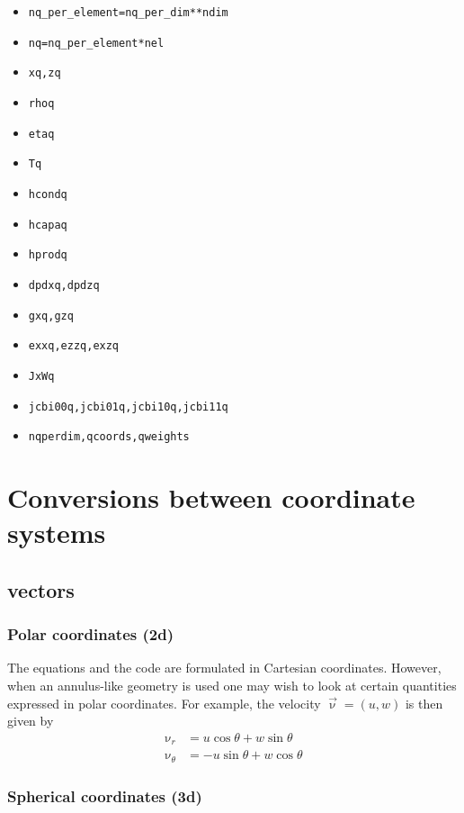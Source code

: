 \documentclass[a4paper,12pt]{article}
\begin{document}
\begin{itemize}
\item \lstinline{nq_per_element=nq_per_dim**ndim}
\item \lstinline{nq=nq_per_element*nel}
\item \lstinline{xq,zq}
\item \lstinline{rhoq}
\item \lstinline{etaq}
\item \lstinline{Tq}
\item \lstinline{hcondq}
\item \lstinline{hcapaq}
\item \lstinline{hprodq}
\item \lstinline{dpdxq,dpdzq}
\item \lstinline{gxq,gzq}
\item \lstinline{exxq,ezzq,exzq}
\item \lstinline{JxWq}
\item \lstinline{jcbi00q,jcbi01q,jcbi10q,jcbi11q}
\item \lstinline{nqperdim,qcoords,qweights}
\end{itemize}


\newpage
\section{Conversions between coordinate systems}

\subsection{vectors}

\subsubsection{Polar coordinates (2d)}

The equations and the code are formulated in Cartesian coordinates. 
However, when an annulus-like geometry is used one may wish to look at 
certain quantities expressed in polar coordinates.
For example, the velocity $\vec\upnu=(u,w)$ is then given by
\begin{align}
\upnu_r &=  u \cos\theta + w \sin\theta \\
\upnu_\theta &= -u \sin\theta + w \cos\theta
\end{align}

\subsubsection{Spherical coordinates (3d)}
\end{document}
